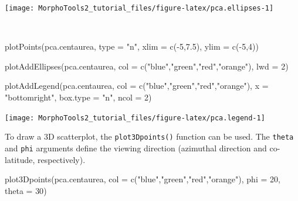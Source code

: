 \documentclass[
  11pt,
  a4paper]{article}
\newenvironment{Shaded}{\begin{snugshade}}{\end{snugshade}}
\newcommand{\AttributeTok}[1]{\textcolor[rgb]{0.77,0.63,0.00}{#1}}
\newcommand{\DecValTok}[1]{\textcolor[rgb]{0.00,0.00,0.81}{#1}}
\newcommand{\FloatTok}[1]{\textcolor[rgb]{0.00,0.00,0.81}{#1}}
\newcommand{\FunctionTok}[1]{\textcolor[rgb]{0.00,0.00,0.00}{#1}}
\newcommand{\NormalTok}[1]{#1}
\newcommand{\SpecialCharTok}[1]{\textcolor[rgb]{0.00,0.00,0.00}{#1}}
\newcommand{\StringTok}[1]{\textcolor[rgb]{0.31,0.60,0.02}{#1}}
\begin{document}
\begin{center}\texttt{[image: MorphoTools2\_tutorial\_files/figure-latex/pca.ellipses-1]} \end{center}

~\\
\hspace*{0.333em}

\begin{Shaded}
\begin{Highlighting}[]
\FunctionTok{plotPoints}\NormalTok{(pca.centaurea, }\AttributeTok{type =} \StringTok{"n"}\NormalTok{, }\AttributeTok{xlim =} \FunctionTok{c}\NormalTok{(}\SpecialCharTok{{-}}\DecValTok{5}\NormalTok{,}\FloatTok{7.5}\NormalTok{), }\AttributeTok{ylim =} \FunctionTok{c}\NormalTok{(}\SpecialCharTok{{-}}\DecValTok{5}\NormalTok{,}\DecValTok{4}\NormalTok{))}

\FunctionTok{plotAddEllipses}\NormalTok{(pca.centaurea, }\AttributeTok{col =} \FunctionTok{c}\NormalTok{(}\StringTok{"blue"}\NormalTok{,}\StringTok{"green"}\NormalTok{,}\StringTok{"red"}\NormalTok{,}\StringTok{"orange"}\NormalTok{), }\AttributeTok{lwd =} \DecValTok{2}\NormalTok{)}

\FunctionTok{plotAddLegend}\NormalTok{(pca.centaurea, }\AttributeTok{col =} \FunctionTok{c}\NormalTok{(}\StringTok{"blue"}\NormalTok{,}\StringTok{"green"}\NormalTok{,}\StringTok{"red"}\NormalTok{,}\StringTok{"orange"}\NormalTok{), }
                       \AttributeTok{x =} \StringTok{"bottomright"}\NormalTok{, }\AttributeTok{box.type =} \StringTok{"n"}\NormalTok{, }\AttributeTok{ncol =} \DecValTok{2}\NormalTok{)}
\end{Highlighting}
\end{Shaded}

\begin{center}\texttt{[image: MorphoTools2\_tutorial\_files/figure-latex/pca.legend-1]} \end{center}

\newpage

To draw a 3D scatterplot, the \texttt{plot3Dpoints()} function can be
used. The \texttt{theta} and \texttt{phi} arguments define the viewing
direction (azimuthal direction and co-latitude, respectively).

\begin{Shaded}
\begin{Highlighting}[]
\FunctionTok{plot3Dpoints}\NormalTok{(pca.centaurea, }\AttributeTok{col =} \FunctionTok{c}\NormalTok{(}\StringTok{"blue"}\NormalTok{,}\StringTok{"green"}\NormalTok{,}\StringTok{"red"}\NormalTok{,}\StringTok{"orange"}\NormalTok{),}
             \AttributeTok{phi =} \DecValTok{20}\NormalTok{, }\AttributeTok{theta =} \DecValTok{30}\NormalTok{)}
\end{Highlighting}
\end{Shaded}
\end{document}
